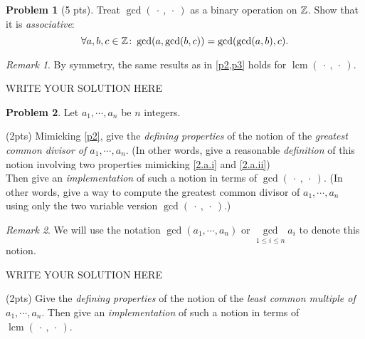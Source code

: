 \documentclass[11pt]{article}
\theoremstyle{plain}
\theoremstyle{definition}
\newtheorem{problem}{Problem}
\theoremstyle{remark}
\newtheorem*{remark}{Remark}
\newtheorem*{hint}{Hint}
\numberwithin{equation}{problem}
\DeclareMathOperator*\lcm{lcm}
\begin{document}
\begin{problem}[5 pts]\label{p3}
	Treat $\gcd(\:\cdot\:,\:\cdot\:)$ as a binary operation on $\mathbb{Z}$. Show that it is \emph{associative}:
	\[
		\forall a,b,c\in\mathbb{Z} \colon \gcd(a,\gcd(b,c)) = \gcd(\gcd(a,b),c).
	\]
\end{problem}
\begin{remark}
	By symmetry, the same results as in \cref{p2,p3} holds for $\lcm(\:\cdot\:,\:\cdot\:)$.
\end{remark}

\begin{solution} %
WRITE YOUR SOLUTION HERE
\end{solution}\clearpage %

\begin{problem}
	Let $a_1,\cdots,a_n$ be $n$ integers. 
	\begin{listinprob}
		\item (2pts) Mimicking \cref{p2}, give the \emph{defining properties} of the notion of the \emph{greatest common divisor of $a_1,\cdots,a_n$}. (In other words, give a reasonable \emph{definition} of this notion involving two properties mimicking \ref{2.a.i} and \ref{2.a.ii}) \\
		Then give an \emph{implementation} of such a notion in terms of $\gcd(\:\cdot\:,\:\cdot\:)$. (In other words, give a way to compute the greatest common divisor of $a_1,\cdots,a_n$ using only the two variable version $\gcd(\:\cdot\:,\:\cdot\:)$.) 
		
		\begin{remark}
			We will use the notation $\gcd(a_1,\cdots,a_n)$ or $\gcd\limits_{1\le i\le n}a_i$ to denote this notion.
		\end{remark}

\begin{solution} %
WRITE YOUR SOLUTION HERE
\end{solution}\clearpage %

		\item (2pts) Give the \emph{defining properties} of the notion of the \emph{least common multiple of $a_1,\cdots,a_n$}. Then give an \emph{implementation} of such a notion in terms of $\lcm(\:\cdot\:,\:\cdot\:)$. 
		

\end{listinprob}
\end{problem}
\end{document}
